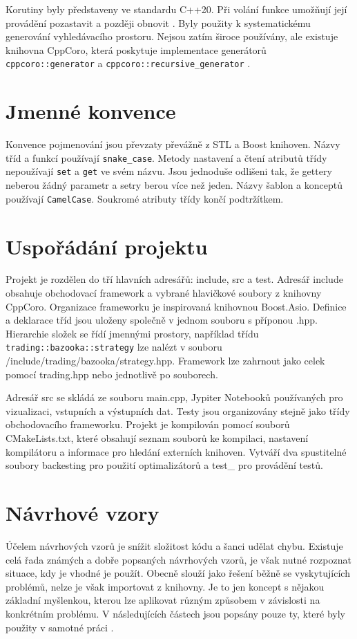 Korutiny byly představeny ve standardu C++20.
Při volání funkce umožňují její provádění pozastavit a později obnovit \cite{coroutines}.
Byly použity k systematickému generování vyhledávacího prostoru.
Nejsou zatím široce používány, ale existuje knihovna CppCoro, která poskytuje implementace generátorů \texttt{cppcoro::generator} a \texttt{cppcoro::recursive\_generator} \cite{cppcoro}.


\section{Jmenné konvence}
Konvence pojmenování jsou převzaty převážně z STL a Boost knihoven.
Názvy tříd a funkcí používají \texttt{snake\_case}.
Metody nastavení a čtení atributů třídy nepoužívají \texttt{set} a \texttt{get} ve svém názvu.
Jsou jednoduše odlišeni tak, že gettery neberou žádný parametr a setry berou více než jeden.
Názvy šablon a konceptů používají \texttt{CamelCase}.
Soukromé atributy třídy končí podtržítkem.

\section{Uspořádání projektu}
Projekt je rozdělen do tří hlavních adresářů: include, src a test.
Adresář include obsahuje obchodovací framework a vybrané hlavičkové soubory z knihovny CppCoro.
Organizace frameworku je inspirovaná knihovnou Boost.Asio.
Definice a deklarace tříd jsou uloženy společně v jednom souboru s příponou .hpp.
Hierarchie složek se řídí jmennými prostory, například třídu \texttt{trading::bazooka::strategy} lze nalézt v souboru /include/trading/bazooka/strategy.hpp.
Framework lze zahrnout jako celek pomocí trading.hpp nebo jednotlivě po souborech.

Adresář src se skládá ze souboru main.cpp, Jypiter Notebooků používaných pro vizualizaci, vstupních a výstupních dat.
Testy jsou organizovány stejně jako třídy obchodovacího frameworku.
Projekt je kompilován pomocí souborů CMakeLists.txt, které obsahují seznam souborů ke kompilaci, nastavení kompilátoru a informace pro hledání externích knihoven.
Vytváří dva spustitelné soubory backesting pro použití optimalizátorů a test\_ pro provádění testů.

\section{Návrhové vzory}
Účelem návrhových vzorů je snížit složitost kódu a šanci udělat chybu.
Existuje celá řada známých a dobře popsaných návrhových vzorů, je však nutné rozpoznat situace, kdy je vhodné je použít.
Obecně slouží jako řešení běžně se vyskytujících problémů, nelze je však importovat z knihovny.
Je to jen koncept s nějakou základní myšlenkou, kterou lze aplikovat různým způsobem v závislosti na konkrétním problému.
V následujících částech jsou popsány pouze ty, které byly použity v samotné práci \cite{design-pattern}.

